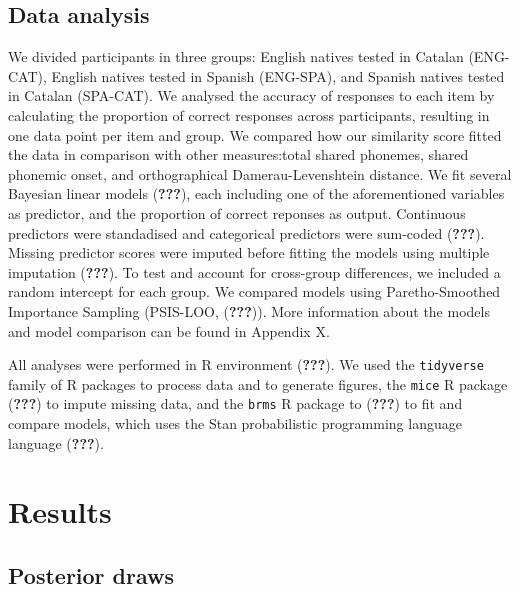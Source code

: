 \documentclass[
  english,
  man]{apa6}
\begin{document}
\hypertarget{data-analysis}{%
\subsection{Data analysis}\label{data-analysis}}

We divided participants in three groups: English natives tested in Catalan (ENG-CAT), English natives tested in Spanish (ENG-SPA), and Spanish natives tested in Catalan (SPA-CAT). We analysed the accuracy of responses to each item by calculating the proportion of correct responses across participants, resulting in one data point per item and group. We compared how our similarity score fitted the data in comparison with other measures:total shared phonemes, shared phonemic onset, and orthographical Damerau-Levenshtein distance. We fit several Bayesian linear models ({\textbf{???}}), each including one of the aforementioned variables as predictor, and the proportion of correct reponses as output. Continuous predictors were standadised and categorical predictors were sum-coded ({\textbf{???}}). Missing predictor scores were imputed before fitting the models using multiple imputation ({\textbf{???}}). To test and account for cross-group differences, we included a random intercept for each group. We compared models using Paretho-Smoothed Importance Sampling (PSIS-LOO, ({\textbf{???}})). More information about the models and model comparison can be found in Appendix X.

All analyses were performed in R environment ({\textbf{???}}). We used the \texttt{tidyverse} family of R packages to process data and to generate figures, the \texttt{mice} R package ({\textbf{???}}) to impute missing data, and the \texttt{brms} R package to ({\textbf{???}}) to fit and compare models, which uses the Stan probabilistic programming language language ({\textbf{???}}).

\hypertarget{results}{%
\section{Results}\label{results}}

\hypertarget{posterior-draws}{%
\subsection{Posterior draws}\label{posterior-draws}}
\end{document}
